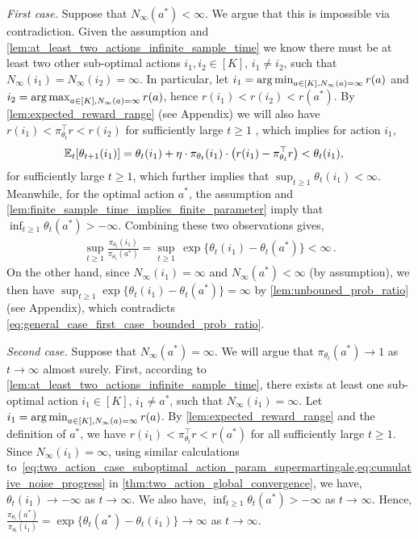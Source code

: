 \textit{First case.} Suppose that $N_\infty(a^*) < \infty$. We argue that this is impossible via contradiction. 
Given the assumption and \cref{lem:at_least_two_actions_infinite_sample_time} we know there must be at least two other sub-optimal actions $i_1, i_2 \in [K]$, $i_1 \ne i_2$, such that $N_\infty(i_1) = N_\infty(i_2) = \infty$.
In particular, let $i_1=\operatorname*{arg\,min}_{a \in [K], N_\infty(a) = \infty} r(a)$
and $i_2=\operatorname*{arg\,max}_{a \in [K], N_\infty(a) = \infty} r(a)$,
hence $r(i_1) < r(i_2) < r(a^*)$.
By \cref{lem:expected_reward_range} (see Appendix) we will also have $r(i_1) < \pi_{\theta_t}^\top r < r(i_2)$ for sufficiently large $t \ge 1$ , which implies for  action $i_1$,
\begin{align}
\label{eq:general_case_first_case_suboptimal_action_param_supermartingale}
    \mathbb{E}_t[\theta_{t+1}(i_1)] &= \theta_t(i_1) + \eta \cdot \pi_{\theta_t}(i_1) \cdot \left(  r(i_1) - \pi_{\theta_t}^\top r \right) < \theta_t(i_1),
\end{align}
for sufficiently large $t \ge 1$, which further implies
that $\sup_{t \ge 1}{ \theta_t(i_1) } < \infty$. 
Meanwhile, for the optimal action $a^*$, the assumption and \cref{lem:finite_sample_time_implies_finite_parameter} imply that $\inf_{t \ge 1}{ \theta_t(a^*)} > -\infty$.
Combining these two observations gives,
\begin{align}
\label{eq:general_case_first_case_bounded_prob_ratio}
    \sup_{t \ge 1}{ \frac{\pi_{\theta_t}(i_1)}{\pi_{\theta_t}(a^*)} } = \sup_{t \ge 1} \, \exp\{ \theta_t(i_1) - \theta_t(a^*) \}  < \infty \,.
\end{align}
On the other hand, since $N_\infty(i_1) = \infty$ and $N_\infty(a^*) < \infty$ (by assumption), we then have
$\sup_{t \ge 1}{ \exp\{ \theta_t(i_1) - \theta_t(a^*)} \} = \infty$
by \cref{lem:unbouned_prob_ratio} (see Appendix), which contradicts \cref{eq:general_case_first_case_bounded_prob_ratio}. 



\textit{Second case.} Suppose that $N_\infty(a^*) = \infty$. We will argue that $\pi_{\theta_t}(a^*) \to 1$ as $t \to \infty$ almost surely.
First, according to \cref{lem:at_least_two_actions_infinite_sample_time}, there exists at least one sub-optimal action $i_1\in[K]$, $i_1\neq a^*$, such that $N_\infty(i_1) = \infty$.
Let $i_1=\operatorname*{arg\,min}_{a \in [K], N_\infty(a) = \infty} r(a)$.
By \cref{lem:expected_reward_range} and the definition of $a^*$, we have $r(i_1) < \pi_{\theta_t}^\top r < r(a^*)$ for all sufficiently large $t \ge 1$. Since $N_\infty(i_1) = \infty$, using similar calculations to~\cref{eq:two_action_case_suboptimal_action_param_supermartingale,eq:cumulative_noise_progress} in \cref{thm:two_action_global_convergence}, we have, $\theta_t(i_1) \to -\infty$ as $t \to \infty$. We also have, $\inf_{t \ge 1} \theta_t(a^*) > - \infty$ as $t \to \infty$. Hence, $\frac{ \pi_{\theta_t}(a^*) }{ \pi_{\theta_t}(i_1)} = \exp\{ \theta_t(a^*) - \theta_t(i_1) \} \to \infty$ as $t \to \infty$. 

